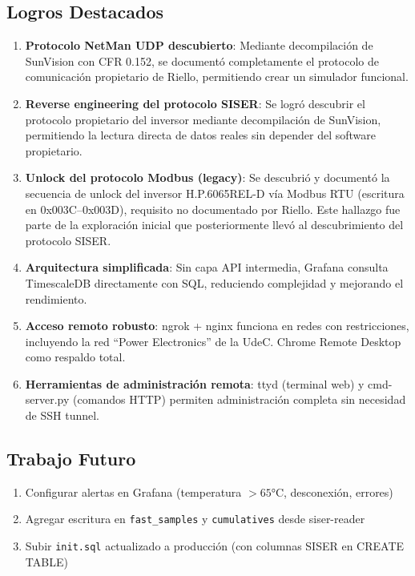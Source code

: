 \documentclass[12pt,a4paper]{article}
\begin{document}
\subsection{Logros Destacados}

\begin{enumerate}
    \item \textbf{Protocolo NetMan UDP descubierto}: Mediante decompilaci\'on de SunVision con CFR 0.152, se document\'o completamente el protocolo de comunicaci\'on propietario de Riello, permitiendo crear un simulador funcional.

    \item \textbf{Reverse engineering del protocolo SISER}: Se logr\'o descubrir el protocolo propietario del inversor mediante decompilaci\'on de SunVision, permitiendo la lectura directa de datos reales sin depender del software propietario.

    \item \textbf{Unlock del protocolo Modbus (legacy)}: Se descubri\'o y document\'o la secuencia de unlock del inversor H.P.6065REL-D v\'ia Modbus RTU (escritura en 0x003C--0x003D), requisito no documentado por Riello. Este hallazgo fue parte de la exploraci\'on inicial que posteriormente llev\'o al descubrimiento del protocolo SISER.

    \item \textbf{Arquitectura simplificada}: Sin capa API intermedia, Grafana consulta TimescaleDB directamente con SQL, reduciendo complejidad y mejorando el rendimiento.

    \item \textbf{Acceso remoto robusto}: ngrok + nginx funciona en redes con restricciones, incluyendo la red ``Power Electronics'' de la UdeC. Chrome Remote Desktop como respaldo total.

    \item \textbf{Herramientas de administraci\'on remota}: ttyd (terminal web) y cmd-server.py (comandos HTTP) permiten administraci\'on completa sin necesidad de SSH tunnel.
\end{enumerate}

\subsection{Trabajo Futuro}

\begin{enumerate}
    \item Configurar alertas en Grafana (temperatura $>65$°C, desconexi\'on, errores)
    \item Agregar escritura en \texttt{fast\_samples} y \texttt{cumulatives} desde siser-reader
    \item Subir \texttt{init.sql} actualizado a producci\'on (con columnas SISER en CREATE TABLE)
\end{enumerate}
\end{document}
